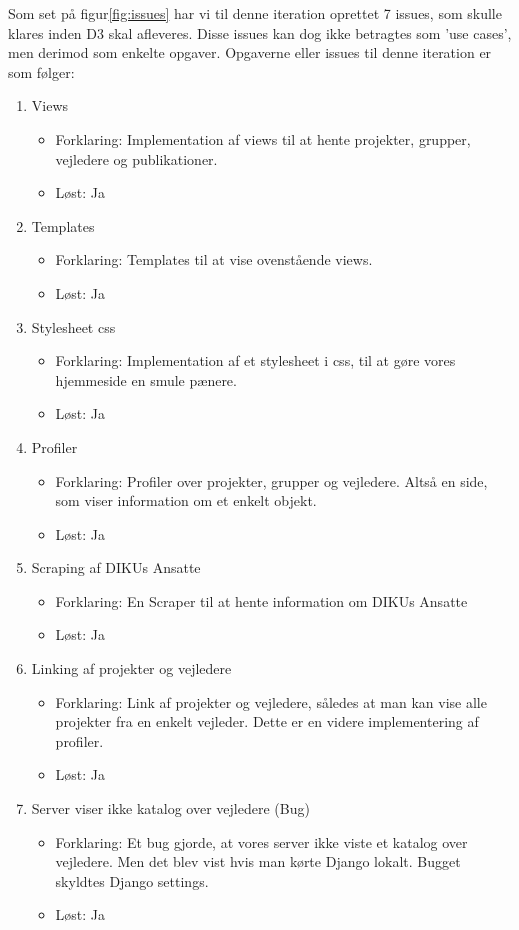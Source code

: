 \documentclass[11pt]{article}
\begin{document}
Som set på figur\ref{fig:issues} har vi til denne iteration oprettet 7 issues, som skulle klares inden D3 skal afleveres. Disse issues kan dog ikke betragtes som 'use cases', men derimod som enkelte opgaver. Opgaverne eller issues til denne iteration er som følger:

\begin{enumerate}
\item Views
	\begin{itemize}
	\item Forklaring: Implementation af views til at hente projekter, grupper, vejledere og publikationer.
	\item Løst: Ja
	\end{itemize}
\item Templates
	\begin{itemize}
	\item Forklaring: Templates til at vise ovenstående views.
	\item Løst: Ja
	\end{itemize}
\item Stylesheet css
	\begin{itemize}
	\item Forklaring: Implementation af et stylesheet i css, til at gøre vores hjemmeside en smule pænere.
	\item Løst: Ja
	\end{itemize}
\item Profiler
	\begin{itemize}
	\item Forklaring: Profiler over projekter, grupper og vejledere. Altså en side, som viser information om et enkelt objekt.
	\item Løst: Ja
	\end{itemize}
\item Scraping af DIKUs Ansatte
	\begin{itemize}
	\item Forklaring: En Scraper til at hente information om DIKUs Ansatte
	\item Løst: Ja
	\end{itemize}
\item Linking af projekter og vejledere
	\begin{itemize}
	\item Forklaring: Link af projekter og vejledere, således at man kan vise alle projekter fra en enkelt vejleder. Dette er en videre implementering af profiler.
	\item Løst: Ja
	\end{itemize}
\item Server viser ikke katalog over vejledere (Bug)
	\begin{itemize}
	\item Forklaring: Et bug gjorde, at vores server ikke viste et katalog over vejledere. Men det blev vist hvis man kørte Django lokalt. Bugget skyldtes Django settings.
	\item Løst: Ja
	\end{itemize}
\end{enumerate}
\end{document}
